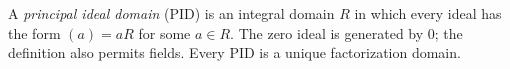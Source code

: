 
A \emph{principal ideal domain} (PID) is an integral domain $R$ in which every ideal has the form $(a)=aR$ for some $a\in R$. The zero ideal is generated by $0$; the definition also permits fields. Every PID is a unique factorization domain.
